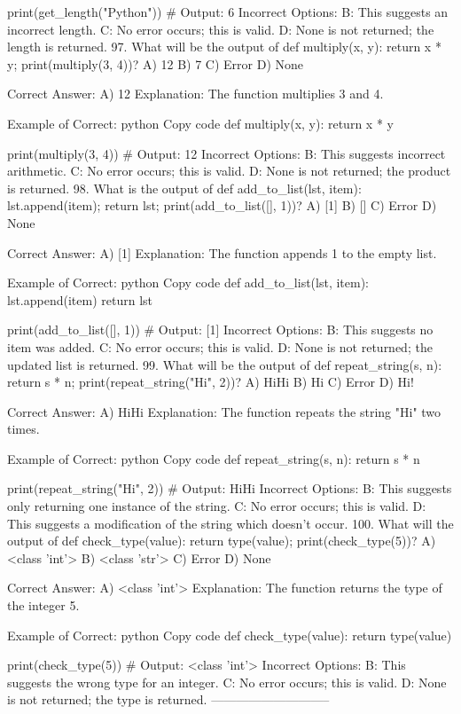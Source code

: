 print(get_length("Python"))  # Output: 6
Incorrect Options:
B: This suggests an incorrect length.
C: No error occurs; this is valid.
D: None is not returned; the length is returned.
97. What will be the output of def multiply(x, y): return x * y; print(multiply(3, 4))?
A) 12
B) 7
C) Error
D) None

Correct Answer: A) 12
Explanation: The function multiplies 3 and 4.

Example of Correct:
python
Copy code
def multiply(x, y):
    return x * y

print(multiply(3, 4))  # Output: 12
Incorrect Options:
B: This suggests incorrect arithmetic.
C: No error occurs; this is valid.
D: None is not returned; the product is returned.
98. What is the output of def add_to_list(lst, item): lst.append(item); return lst; print(add_to_list([], 1))?
A) [1]
B) []
C) Error
D) None

Correct Answer: A) [1]
Explanation: The function appends 1 to the empty list.

Example of Correct:
python
Copy code
def add_to_list(lst, item):
    lst.append(item)
    return lst

print(add_to_list([], 1))  # Output: [1]
Incorrect Options:
B: This suggests no item was added.
C: No error occurs; this is valid.
D: None is not returned; the updated list is returned.
99. What will be the output of def repeat_string(s, n): return s * n; print(repeat_string("Hi", 2))?
A) HiHi
B) Hi
C) Error
D) Hi!

Correct Answer: A) HiHi
Explanation: The function repeats the string "Hi" two times.

Example of Correct:
python
Copy code
def repeat_string(s, n):
    return s * n

print(repeat_string("Hi", 2))  # Output: HiHi
Incorrect Options:
B: This suggests only returning one instance of the string.
C: No error occurs; this is valid.
D: This suggests a modification of the string which doesn't occur.
100. What will the output of def check_type(value): return type(value); print(check_type(5))?
A) <class 'int'>
B) <class 'str'>
C) Error
D) None

Correct Answer: A) <class 'int'>
Explanation: The function returns the type of the integer 5.

Example of Correct:
python
Copy code
def check_type(value):
    return type(value)

print(check_type(5))  # Output: <class 'int'>
Incorrect Options:
B: This suggests the wrong type for an integer.
C: No error occurs; this is valid.
D: None is not returned; the type is returned.
-----------------------------

